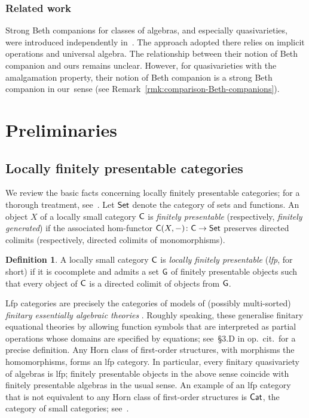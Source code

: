 \documentclass[a4paper,10pt,reqno]{amsart}
\theoremstyle{definition}
\newtheorem{definition}[theorem]{Definition}
\theoremstyle{remark}
\newcommand{\cat}{{\sf C}}								%
\newcommand{\Set}{{\sf Set}}								%
\newcommand{\Cat}{{\sf Cat}}								%
\begin{document}
\subsubsection*{Related work}
Strong Beth companions for classes of algebras, and especially quasivarieties, were introduced independently in~\cite{CKM2026}. The approach adopted there relies on implicit operations and universal algebra. The relationship between their notion of Beth companion and ours remains unclear. However, for quasivarieties with the amalgamation property, their notion of Beth companion is a strong Beth companion in our~sense (see Remark~\ref{rmk:comparison-Beth-companions}).
%


\section{Preliminaries}\label{s:preliminaries}

\subsection{Locally finitely presentable categories}\label{s:lfp}

We review the basic facts concerning locally finitely presentable categories; for a thorough treatment, see~\cite{ar94book}. Let $\Set$ denote the category of sets and functions. An object $X$ of a locally small category $\cat$ is \emph{finitely presentable} (respectively, \emph{finitely generated}) if the associated hom-functor $\cat(X,-)\colon \cat\to\Set$ preserves directed colimits (respectively, directed colimits of monomorphisms).

\begin{definition}
A locally small category $\cat$ is \emph{locally finitely presentable} (\emph{lfp}, for short) if it is cocomplete and admits a set $\sf G$ of finitely presentable objects such that every object of $\cat$ is a directed colimit of objects from $\sf G$.
\end{definition}

Lfp categories are precisely the categories of models of (possibly multi-sorted) \emph{finitary essentially algebraic theories} \cite[Theorem~3.36]{ar94book}. Roughly speaking, these generalise finitary equational theories by allowing function symbols that are interpreted as partial operations whose domains are specified by equations; see~\S 3.D in op.~cit.\ for a precise definition.
%
Any Horn class of first-order structures, with morphisms the homomorphisms, forms an lfp category. In particular, every finitary quasivariety of algebras is lfp; finitely presentable objects in the above sense coincide with finitely presentable algebras in the usual sense. An example of an lfp category that is not equivalent to any Horn class of first-order structures is $\Cat$, the category of small categories; see~\cite{Barr1989}.
\end{document}
